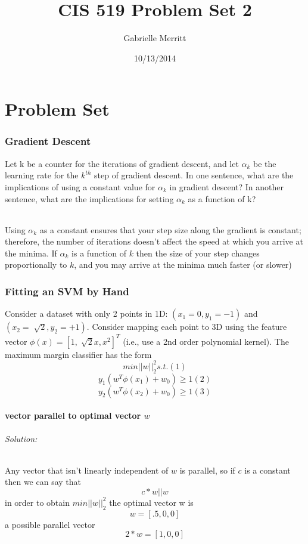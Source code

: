 \documentclass{article}
\title{CIS 519 Problem Set 2}
\author{Gabrielle Merritt}
\date{10/13/2014}
\begin{document}
\maketitle
\part{Problem Set}
\section{Gradient Descent}
Let k be a counter for the iterations of gradient descent, and let $\alpha_{k}$ be the learning rate for the $k^{th}$ step of gradient descent. In one sentence, what are the implications of using a constant value for $\alpha_{k}$ in gradient
descent? In another sentence, what are the implications for setting $\alpha_{k}$ as a function of k?
\paragraph{}
Using $\alpha_{k}$ as a constant ensures that your step size along the gradient is constant; therefore, the number of iterations doesn't affect the speed at which you arrive at the minima. If $\alpha_{k}$ is a function of $k$ then the size of your step changes proportionally to $k$, and you may arrive at the minima much faster (or slower) 

\section{Fitting an SVM by Hand}
Consider a dataset with only 2 points in 1D: $(x_1 =0, y_1 = -1)$ and $(x_2= \sqrt[]{2}, y_2 = +1)$. Consider mapping each point to 3D using the feature vector $\phi(x) = [1,\sqrt[]{2}x,x^2]^T $ (i.e., use a 2nd order polynomial kernel). The maximum margin classifier has the form 
$$ min ||w||^2_2 s.t.	(1)$$
$$ y_1 (w^T\phi{}(x_1) +w_0)\geq1  (2)$$
$$ y_2 (w^T\phi{}(x_2) +w_0)\geq1  (3)$$

\subsection{vector parallel to optimal vector $w$}
\paragraph{Solution:}
Any vector that isn't linearly independent of $w$ is parallel, so if $c$ is a constant then we can say that 
$$ c*w  || w $$ 
in order to obtain $min ||w||^2_2 $ the optimal vector w is 
$$ w= [.5,0,0] $$
a possible parallel vector 
$$ 2*w =[1,0,0] $$
\end{document}
